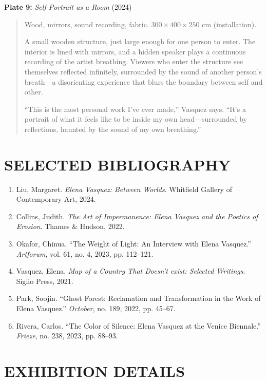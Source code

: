 \documentclass[
    language=english,
    doctype=art-catalogue,
    institution=none,
]{../../omnilatex}
\begin{document}
\textbf{Plate 9:} \textit{Self-Portrait as a Room} (2024)
\begin{quote}
Wood, mirrors, sound recording, fabric.
$300 \times 400 \times 250$ cm (installation).

A small wooden structure, just large enough for one person to enter. The interior is lined with mirrors, and a hidden speaker plays a continuous recording of the artist breathing. Viewers who enter the structure see themselves reflected infinitely, surrounded by the sound of another person's breath---a disorienting experience that blurs the boundary between self and other.

``This is the most personal work I've ever made,'' Vasquez says. ``It's a portrait of what it feels like to be inside my own head---surrounded by reflections, haunted by the sound of my own breathing.''
\end{quote}

\section*{SELECTED BIBLIOGRAPHY}

\begin{enumerate}
    \item Liu, Margaret. \textit{Elena Vasquez: Between Worlds}. Whitfield Gallery of Contemporary Art, 2024.
    \item Collins, Judith. \textit{The Art of Impermanence: Elena Vasquez and the Poetics of Erosion}. Thames \& Hudson, 2022.
    \item Okafor, Chinua. ``The Weight of Light: An Interview with Elena Vasquez.'' \textit{Artforum}, vol. 61, no. 4, 2023, pp. 112--121.
    \item Vasquez, Elena. \textit{Map of a Country That Doesn't exist: Selected Writings}. Siglio Press, 2021.
    \item Park, Soojin. ``Ghost Forest: Reclamation and Transformation in the Work of Elena Vasquez.'' \textit{October}, no. 189, 2022, pp. 45--67.
    \item Rivera, Carlos. ``The Color of Silence: Elena Vasquez at the Venice Biennale.'' \textit{Frieze}, no. 238, 2023, pp. 88--93.
\end{enumerate}

\section*{EXHIBITION DETAILS}
\end{document}
